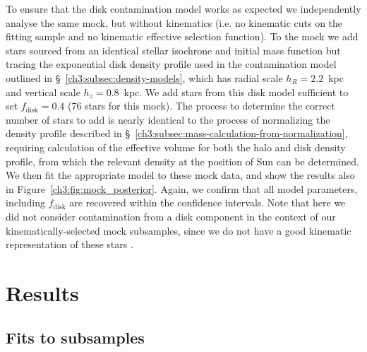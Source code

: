 To ensure that the disk contamination model works as expected we independently analyse the same mock, but without kinematics (i.e. no kinematic cuts on the fitting sample and no kinematic effective selection function). To the mock we add stars sourced from an identical stellar isochrone and initial mass function but tracing the exponential disk density profile used in the contamination model outlined in \S~\ref{ch3:subsec:density-models}, which has radial scale $h_{R} = 2.2$~kpc and vertical scale $h_{z} = 0.8$~kpc. We add stars from this disk model sufficient to set $f_\mathrm{disk}=0.4$ (76 stars for this mock). The process to determine the correct number of stars to add is nearly identical to the process of normalizing the density profile described in \S~\ref{ch3:subsec:mass-calculation-from-normalization}, requiring calculation of the effective volume for both the halo and disk density profile, from which the relevant density at the position of Sun can be determined. We then fit the appropriate model to these mock data, and show the results also in Figure~\ref{ch3:fig:mock_posterior}. Again, we confirm that all model parameters, including $f_\mathrm{disk}$ are recovered within the confidence intervals. Note that here we did not consider contamination from a disk component in the context of our kinematically-selected mock subsamples, since we do not have a good kinematic representation of these stars \parencite[see][ and discussion above]{lane22}.

\section{Results}
\label{ch3:sec:results}

\subsection{Fits to \gse subsamples}
\label{ch3:subsec:fits-to-gse}



